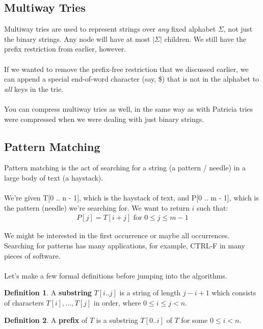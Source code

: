 \documentclass[]{article}
\theoremstyle{definition}
\newtheorem*{defn}{Definition}
\begin{document}
		\subsection{Multiway Tries}
			Multiway tries are used to represent strings over \emph{any} fixed alphabet $\Sigma$, not just the binary strings. Any node will have at most $|\Sigma|$ children. We still have the prefix restriction from earlier, however.
			\\ \\
			If we wanted to remove the prefix-free restriction that we discussed earlier, we can append a special end-of-word character (say, \$) that is not in the alphabet to \emph{all} keys in the trie.
			\\ \\
			You can compress multiway tries as well, in the same way as with Patricia tries were compressed when we were dealing with just binary strings.

		\subsection{Pattern Matching}
			Pattern matching is the act of searching for a string (a pattern / needle) in a large body of text (a haystack).
			\\ \\
			We're given T[0 .. n - 1], which is the haystack of text, and P[0 .. m - 1], which is the pattern (needle) we're searching for. We want to return $i$ such that:
			\begin{align*}
				P[j] = T[i + j] \text{ for } 0 \le j \le m - 1
			\end{align*}

			We might be interested in the first occurrence or maybe all occurrences. Searching for patterns has many applications, for example, CTRL-F in many pieces of software.
			\\ \\
			Let's make a few formal definitions before jumping into the algorithms.

			\begin{defn}
				A \textbf{substring} $T[i..j]$ is a string of length $j - i + 1$ which consists of characters $T[i], \ldots, T[j]$ in order, where $0 \le i \le j < n$.
			\end{defn}

			\begin{defn}
				A \textbf{prefix} of $T$ is a substring $T[0..i]$ of $T$ for some $0 \le i < n$.
			\end{defn}
\end{document}
